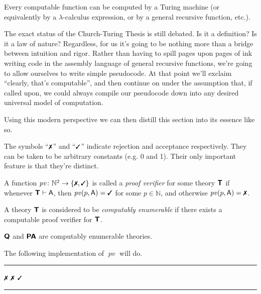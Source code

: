 \documentclass{article}
\theoremstyle{customstyle}
\newenvironment{prf-sketch}{\begin{mdframed}[skipabove=5pt, backgroundcolor=Gray!10, topline=false, bottomline=false, leftline=false, rightline=false]\renewcommand{\proofname}{Proof Sketch}\begin{proof}}{\end{proof}\end{mdframed}}
\newenvironment{algo}{\begin{samepage}\medskip\hrule\begin{algorithmic}}{\end{algorithmic}\hrule\medskip\end{samepage}}
\newcommand{\fm}[1]{\mathsf{#1}}
\DeclareMathOperator{\pc}{\mathit{pv}}
\newcommand{\T}{\textbf{\textsf{T}}}
\newcommand{\Q}{\textbf{\textsf{Q}}}
\newcommand{\PA}{\textbf{\textsf{PA}}}
\newcommand{\cmark}{\text{\small \ding{51}}}
\newcommand{\xmark}{\text{\small \ding{55}}}
\begin{document}
\begin{thesis}
  Every computable function can be computed by a Turing machine (or equivalently by a $\lambda$-calculus expression, or by a general recursive function, etc.).
\end{thesis}

The exact status of the Church-Turing Thesis is still debated. Is it a definition? Is it a law of nature? Regardless, for us it's going to be nothing more than a bridge between intuition and rigor. Rather than having to spill pages upon pages of ink writing code in the assembly language of general recursive functions, we're going to allow ourselves to write simple pseudocode. At that point we'll exclaim ``clearly, that's computable'', and then continue on under the assumption that, if called upon, we could always compile our pseudocode down into any desired universal model of computation.

Using this modern perspective we can then distill this section into its essence like so.

\begin{definition}[$\xmark$, $\cmark$]
  The symbols ``$\xmark$'' and ``$\cmark$'' indicate rejection and acceptance respectively. They can be taken to be arbitrary constants (e.g. 0 and 1). Their only important feature is that they're distinct.
\end{definition}

\begin{definition}
  A function $\pc \colon \mathbb{N}^2 \to \{\xmark, \cmark\}$ is called a \emph{proof verifier} for some theory $\T$ if whenever $\T \vdash \fm{A}$, then $\pc(p, \fm{A}) = \cmark$ for some $p \in \mathbb{N}$, and otherwise $\pc(p, \fm{A}) = \xmark$.
\end{definition}

\begin{definition}
  A theory $\T$ is considered to be \textit{computably enumerable} if there exists a computable proof verifier for $\T$.
\end{definition}

\begin{theorem}
  $\Q$ and $\PA$ are computably enumerable theories.
\end{theorem}

\begin{prf-sketch}
The following implementation of $\pc$ will do.
\begin{algo}
  \Function{$\pc(p, x)$}{}
  \State \Return $\xmark$
  \EndIf
  \EndFor
  \State \Return $\xmark$
  \EndIf
  \State \Return $\cmark$
  \EndFunction
\end{algo}
\end{prf-sketch}
\end{document}
